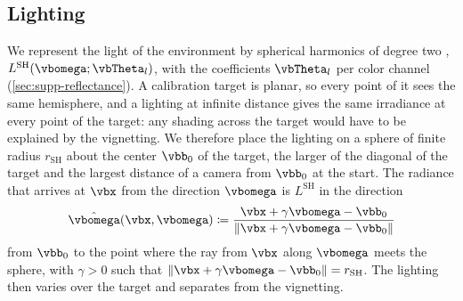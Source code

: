\subsection{Lighting}
\label{sec:lighting}
We represent the light of the environment by spherical harmonics of
degree two \cite{ramamoorthi-2001, peter-pikesloanand2002precomputed},
$L^{\text{SH}}(\vbomega;\vbTheta_l)$, with the coefficients
$\vbTheta_l$ per color channel (\cref{sec:supp-reflectance}). A
calibration target is planar, so every point of it sees the same
hemisphere, and a lighting at infinite distance gives the same
irradiance at every point of the target: any shading across the
target would have to be explained by the vignetting. We therefore
place the lighting on a sphere of finite radius $r_{\text{SH}}$
about the center $\vbb_0$ of the target, the larger of the diagonal
of the target and the largest distance of a camera from $\vbb_0$ at
the start. The radiance that arrives at $\vbx$ from the direction
$\vbomega$ is $L^{\text{SH}}$ in the direction
\begin{equation}
    \hat{\vbomega}(\vbx,\vbomega) \coloneqq \frac{\vbx + \gamma\vbomega - \vbb_0}{\lVert \vbx + \gamma\vbomega - \vbb_0 \rVert}
\end{equation}
from $\vbb_0$ to the point where the ray from $\vbx$ along $\vbomega$
meets the sphere, with $\gamma>0$ such that
$\lVert \vbx + \gamma \vbomega - \vbb_0\rVert = r_{\text{SH}}$. The
lighting then varies over the target and separates from the
vignetting.

